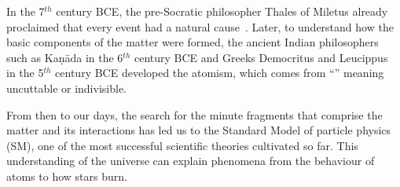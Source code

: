 In the 7$^{th}$ century BCE, the pre-Socratic philosopher Thales of Miletus already proclaimed that every 
event had a natural cause~\cite{Singer_C}. Later, to understand how the basic components of the matter were
formed, the ancient Indian philosophers such as Kaṇāda 
\cite{leaman2002key} in the 6$^{th}$ century BCE
and Greeks Democritus and Leucippus~\cite{taylor2010atomists} in the 5$^{th}$ century BCE developed the atomism,
which comes from ``\greekatom'' meaning uncuttable or indivisible.







From then to our days, the search for the minute fragments that comprise the matter and its interactions has led us to the
 Standard Model of particle physics (SM), one of the most successful scientific theories cultivated so far. This understanding
of the universe can explain phenomena from the behaviour of atoms to how stars burn. 


